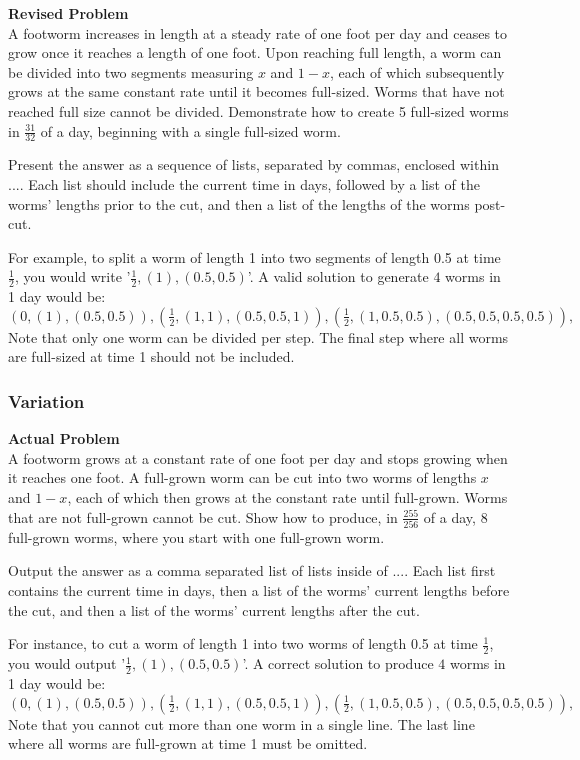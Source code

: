 \textbf{Revised Problem}\\
A footworm increases in length at a steady rate of one foot per day and ceases to grow once it reaches a length of one foot. Upon reaching full length, a worm can be divided into two segments measuring $x$ and $1-x$, each of which subsequently grows at the same constant rate until it becomes full-sized. Worms that have not reached full size cannot be divided. Demonstrate how to create 5 full-sized worms in $\frac{31}{32}$ of a day, beginning with a single full-sized worm.

Present the answer as a sequence of lists, separated by commas, enclosed within $\boxed{...}$. Each list should include the current time in days, followed by a list of the worms' lengths prior to the cut, and then a list of the lengths of the worms post-cut.

For example, to split a worm of length 1 into two segments of length 0.5 at time $\frac{1}{2}$, you would write '$\frac{1}{2}, (1), (0.5, 0.5)$'. A valid solution to generate $4$ worms in 1 day would be:
$\boxed{
    (0, (1), (0.5, 0.5)),
    (\frac{1}{2}, (1, 1), (0.5, 0.5, 1)),
    (\frac{1}{2}, (1, 0.5, 0.5), (0.5, 0.5, 0.5, 0.5)),
}$
Note that only one worm can be divided per step. The final step where all worms are full-sized at time 1 should not be included.

\subsubsection{Variation}
\textbf{Actual Problem}\\
A footworm grows at a constant rate of one foot per day and stops growing when it reaches one foot. A full-grown worm can be cut into two worms of lengths $x$ and $1-x$, each of which then grows at the constant rate until full-grown. Worms that are not full-grown cannot be cut. Show how to produce, in $\frac{255}{256}$ of a day, 8 full-grown worms, where you start with one full-grown worm.

Output the answer as a comma separated list of lists inside of $\boxed{...}$. Each list first contains the current time in days, then a list of the worms' current lengths before the cut, and then a list of the worms' current lengths after the cut.

For instance, to cut a worm of length 1 into two worms of length 0.5 at time $\frac{1}{2}$, you would output '$\frac{1}{2}, (1), (0.5, 0.5)$'. A correct solution to produce $4$ worms in 1 day would be:
$\boxed{
    (0, (1), (0.5, 0.5)),
    (\frac{1}{2}, (1, 1), (0.5, 0.5, 1)),
    (\frac{1}{2}, (1, 0.5, 0.5), (0.5, 0.5, 0.5, 0.5)),
}$
Note that you cannot cut more than one worm in a single line. The last line where all worms are full-grown at time 1 must be omitted.

